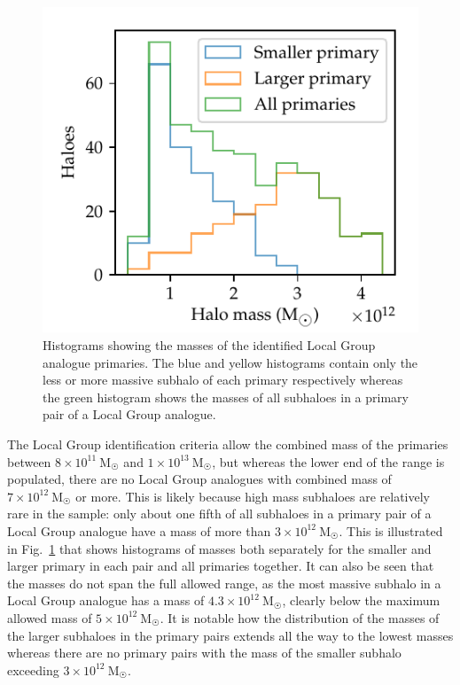 \documentclass[english, twoside]{HYgradu}
\begin{document}
\begin{figure}
    \centering
    \includegraphics{kuvat/masshistogram.pdf}
    \caption{Histograms showing the masses of the identified Local Group analogue primaries. The blue and yellow histograms contain only the less or more massive subhalo of each primary respectively whereas the green histogram shows the masses of all subhaloes in a primary pair of a Local Group analogue.}\label{fig:masshistogram}
\end{figure}

The Local Group identification criteria allow the combined mass of the primaries between $8 \times 10^{11}~\mathrm{M_{\astrosun}}$ and $1 \times 10^{13}~\mathrm{M_{\astrosun}}$, but whereas the lower end of the range is populated, there are no Local Group analogues with combined mass of $7 \times 10^{12}~\mathrm{M_{\astrosun}}$ or more. This is likely because high mass subhaloes are relatively rare in the sample: only about one fifth of all subhaloes in a primary pair of a Local Group analogue have a mass of more than $3 \times 10^{12}~\mathrm{M}_{\astrosun}$. This is illustrated in Fig.~\ref{fig:masshistogram} that shows histograms of masses both separately for the smaller and larger primary in each pair and all primaries together. It can also be seen that the masses do not span the full allowed range, as the most massive subhalo in a Local Group analogue has a mass of $4.3 \times 10^{12}~\mathrm{M}_{\astrosun}$, %
clearly below the maximum allowed mass of $5 \times 10^{12}~\mathrm{M}_{\astrosun}$. It is notable how the distribution of the masses of the larger subhaloes in the primary pairs extends all the way to the lowest masses whereas there are no primary pairs with the mass of the smaller subhalo exceeding $3 \times 10^{12}~\mathrm{M}_{\astrosun}$. %
\end{document}
